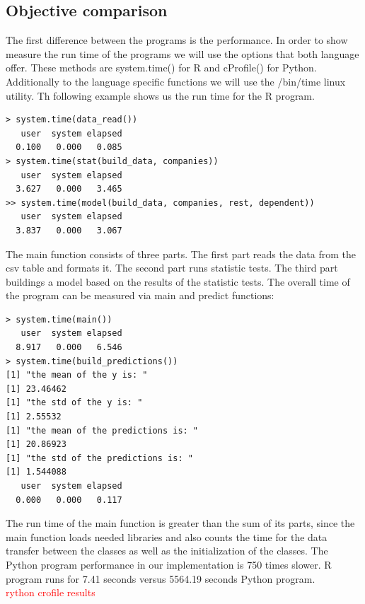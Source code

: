 \documentclass[
  twoside,
  12pt, a4paper,
  footinclude=true,
  headinclude=true,
  cleardoublepage=empty
]{article}
\begin{document}
\subsection{Objective comparison}
The first difference between the programs is the performance. In order to show measure the run time of the programs we will use the options that both language offer. These methods are system.time() for R and cProfile() for Python. Additionally to the language specific functions we will use the /bin/time linux utility. Th following example shows us the run time for the R program.
\begin{verbatim}
> system.time(data_read())                                                                  
   user  system elapsed                                                                       
  0.100   0.000   0.085  
> system.time(stat(build_data, companies))
   user  system elapsed 
  3.627   0.000   3.465
>> system.time(model(build_data, companies, rest, dependent))
   user  system elapsed 
  3.837   0.000   3.067 
\end{verbatim}
The main function consists of three parts. The first part reads the data from the csv table and formats it. The second part runs statistic tests. The third part buildings a model based on the results of the statistic tests. The overall time of the program can be measured via main and predict functions:
\begin{verbatim}
> system.time(main())
   user  system elapsed 
  8.917   0.000   6.546 
> system.time(build_predictions())
[1] "the mean of the y is: "
[1] 23.46462
[1] "the std of the y is: "
[1] 2.55532
[1] "the mean of the predictions is: "
[1] 20.86923
[1] "the std of the predictions is: "
[1] 1.544088
   user  system elapsed 
  0.000   0.000   0.117 
\end{verbatim}
The run time of the main function is greater than the sum of its parts, since the main function loads needed libraries and also counts the time for the data transfer between the classes as well as the initialization of the classes. The Python program performance in our implementation is 750 times slower. R program runs for 7.41 seconds versus 5564.19 seconds Python program.\\
\textcolor{red}{rython crofile results}\\
\end{document}
